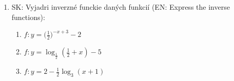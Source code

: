 \documentclass{homework}
\begin{document}
\begin{enumerate}
    \item SK: Vyjadri inverzné funckie daných funkcií (EN: Express the inverse functions): \\
    \begin{enumerate}
        \item $f:y=\big(\frac{1}{2}\big)^{-x+3}-2$ \\
        \item $f:y=\log_{\frac{1}{2}} (\frac{1}{2}+x)-5$ \\
        \item $f:y=2-\frac{1}{2}\log_{3} (x+1)$
    \end{enumerate}
    
\end{enumerate}
\end{document}
